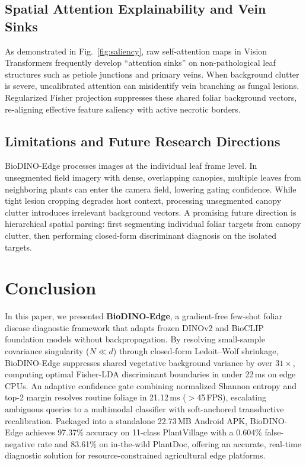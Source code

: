 \documentclass[a4paper,fleqn,nologo]{cas-dc}
\begin{document}
\subsection{Spatial Attention Explainability and Vein Sinks}
As demonstrated in Fig.~\ref{fig:saliency}, raw self-attention maps in Vision Transformers frequently develop ``attention sinks'' \cite{darcet2024vision} on non-pathological leaf structures such as petiole junctions and primary veins. When background clutter is severe, uncalibrated attention can misidentify vein branching as fungal lesions. Regularized Fisher projection suppresses these shared foliar background vectors, re-aligning effective feature saliency with active necrotic borders.

\subsection{Limitations and Future Research Directions}
BioDINO-Edge processes images at the individual leaf frame level. In unsegmented field imagery with dense, overlapping canopies, multiple leaves from neighboring plants can enter the camera field, lowering gating confidence. While tight lesion cropping degrades host context, processing unsegmented canopy clutter introduces irrelevant background vectors. A promising future direction is hierarchical spatial parsing: first segmenting individual foliar targets from canopy clutter, then performing closed-form discriminant diagnosis on the isolated targets.

\section{Conclusion}
\label{sec:conclusion}
In this paper, we presented \textbf{BioDINO-Edge}, a gradient-free few-shot foliar disease diagnostic framework that adapts frozen DINOv2 and BioCLIP foundation models without backpropagation. By resolving small-sample covariance singularity ($N \ll d$) through closed-form Ledoit--Wolf shrinkage, BioDINO-Edge suppresses shared vegetative background variance by over $31\times$, computing optimal Fisher-LDA discriminant boundaries in under 22\,ms on edge CPUs. An adaptive confidence gate combining normalized Shannon entropy and top-2 margin resolves routine foliage in 21.12\,ms ($>$45\,FPS), escalating ambiguous queries to a multimodal classifier with soft-anchored transductive recalibration. Packaged into a standalone 22.73\,MB Android APK, BioDINO-Edge achieves 97.37\% accuracy on 11-class PlantVillage with a 0.604\% false-negative rate and 83.61\% on in-the-wild PlantDoc, offering an accurate, real-time diagnostic solution for resource-constrained agricultural edge platforms.
\end{document}
